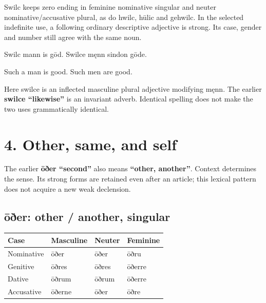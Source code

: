 Swilc keeps zero ending in feminine nominative singular and neuter nominative/\allowbreak{}accusative plural, as do hwilc, hūlic and gehwilc. In the selected indefinite use, a following ordinary descriptive adjective is strong. Its case, gender and number still agree with the same noun.

Swilc mann is gōd. Swilce męnn sindon gōde.

Such a man is good. Such men are good.

Here swilce is an inflected masculine plural adjective modifying męnn. The earlier \textbf{swilce “likewise”} is an invariant adverb. Identical spelling does not make the two uses grammatically identical.

\section*{4. Other, same, and self}

The earlier \textbf{ōðer “second”} also means \textbf{“other, another”}. Context determines the sense. Its strong forms are retained even after an article; this lexical pattern does not acquire a new weak declension.

\subsection*{ōðer: other /\allowbreak{} another, singular}

\par\begingroup
\fontsize{10.5}{13.2}\selectfont
\setlength{\LTleft}{0pt}\setlength{\LTright}{\fill}
\noindent
\begin{tabular}{@{}>{\raggedright\arraybackslash}p{28.89mm}>{\raggedright\arraybackslash}p{28.89mm}>{\raggedright\arraybackslash}p{28.89mm}>{\raggedright\arraybackslash}p{28.89mm}@{}}
\toprule
\textbf{Case} & \textbf{Masculine} & \textbf{Neuter} & \textbf{Feminine} \\
\midrule
Nominative & ōðer & ōðer & ōðru \\
Genitive & ōðres & ōðres & ōðerre \\
Dative & ōðrum & ōðrum & ōðerre \\
Accusative & ōðerne & ōðer & ōðre \\
\bottomrule
\end{tabular}
\par\endgroup

